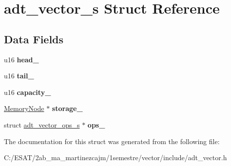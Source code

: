 \hypertarget{structadt__vector__s}{}\section{adt\+\_\+vector\+\_\+s Struct Reference}
\label{structadt__vector__s}
\subsection*{Data Fields}
\begin{DoxyCompactItemize}
\item 
\mbox{\label{structadt__vector__s_afce205d02a7eb385904c5e6e8a733953}} 
u16 {\bfseries head\+\_\+}
\item 
\mbox{\label{structadt__vector__s_a46477cda7c088728e8108517e61b5ec9}} 
u16 {\bfseries tail\+\_\+}
\item 
\mbox{\label{structadt__vector__s_afcb7bfdd429a05de39afb3c0b3de7c94}} 
u16 {\bfseries capacity\+\_\+}
\item 
\mbox{\label{structadt__vector__s_a85760ed89e47d0d91f9054338ffcf8c2}} 
\hyperlink{structmemory__node__s}{Memory\+Node} $\ast$ {\bfseries storage\+\_\+}
\item 
\mbox{\label{structadt__vector__s_ad0ddb7414522b14543d648bbf399e0bb}} 
struct \hyperlink{structadt__vector__ops__s}{adt\+\_\+vector\+\_\+ops\+\_\+s} $\ast$ {\bfseries ops\+\_\+}
\end{DoxyCompactItemize}


The documentation for this struct was generated from the following file\+:\begin{DoxyCompactItemize}
\item 
C\+:/\+E\+S\+A\+T/2ab\+\_\+ma\+\_\+martinezcajm/1semestre/vector/include/adt\+\_\+vector.\+h\end{DoxyCompactItemize}

